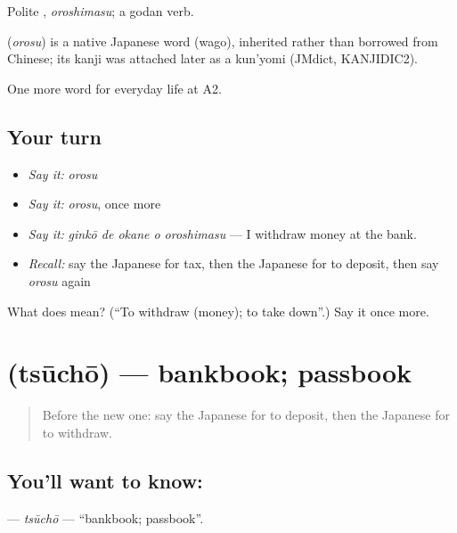 Polite \textbf{}, \emph{oroshimasu}; a godan verb.

\begin{cousinweb}
\textbf{} (\emph{orosu}) is a native Japanese word (wago), inherited rather than borrowed from Chinese; its kanji was attached later as a kun'yomi (JMdict, KANJIDIC2).
\end{cousinweb}

\begin{grammarlens}[title={What you've built}]
One more word for everyday life at A2.
\end{grammarlens}

\subsection*{Your turn}
\begin{itemize}
\raggedright
  \item \emph{Say it:} \emph{orosu}
  \item \emph{Say it:} \emph{orosu}, once more
  \item \emph{Say it:} \emph{ginkō de okane o oroshimasu} — I withdraw money at the bank.
  \item \emph{Recall:} say the Japanese for tax, then the Japanese for to deposit, then say \emph{orosu} again
\end{itemize}

\begin{tcolorbox}[breakable,colback=teal!4,colframe=teal!35!black,title={Before you move on}]
What does  mean? (\textquotedblleft{}To withdraw (money); to take down\textquotedblright{}.) Say it once more.
\end{tcolorbox}
\section[\texorpdfstring{\ja{つうちょう} (tsūchō)}{つうちょう (tsūchō)}]{ (tsūchō) — bankbook; passbook}

\label{lesson:JA-C187-tsuuchou}



\begin{quote}
Before the new one: say the Japanese for to deposit, then the Japanese for to withdraw.
\end{quote}

\subsection*{You'll want to know: }
\textbf{} — \emph{tsūchō} — \textquotedblleft{}bankbook; passbook\textquotedblright{}.

